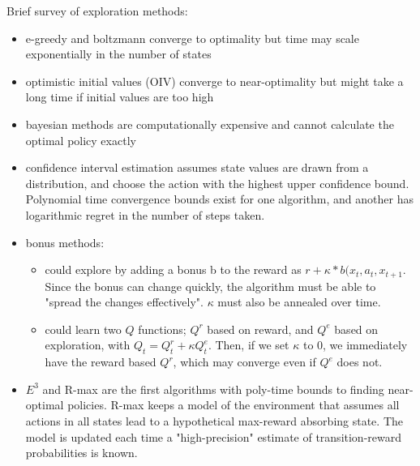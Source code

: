 \documentclass[12pt, oneside]{amsart}
\begin{document}
	Brief survey of exploration methods:
	\begin{itemize}
		\item e-greedy and boltzmann converge to optimality but time may scale exponentially in the number of states
		\item optimistic initial values (OIV) converge to near-optimality but might take a long time if initial values are too high
		\item bayesian methods are computationally expensive and cannot calculate the optimal policy exactly
		\item confidence interval estimation assumes state values are drawn from a distribution, and choose the action with the highest upper confidence bound. Polynomial time convergence bounds exist for one algorithm, and another has logarithmic regret in the number of steps taken.
		\item bonus methods:
		\begin{itemize}
			\item could explore by adding a bonus b to the reward as $r + \kappa * b(x_t, a_t, x_{t+1}$. Since the bonus can change quickly, the algorithm must be able to "spread the changes effectively". $\kappa$ must also be annealed over time.
			\item could learn two $Q$ functions; $Q^r$ based on reward, and $Q^e$ based on exploration, with $Q_t = Q^r_t + \kappa Q^e_t$. Then, if we set $\kappa$ to 0, we immediately have the reward based $Q^r$, which may converge even if $Q^e$ does not.
		\end{itemize}
		\item $E^3$ and R-max are the first algorithms with poly-time bounds to finding near-optimal policies. R-max keeps a model of the environment that assumes all actions in all states lead to a hypothetical max-reward absorbing state. The model is updated each time a "high-precision" estimate of transition-reward probabilities is known.
	\end{itemize}
	
\end{document}
